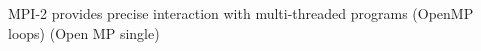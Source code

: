 
MPI-2 provides precise interaction with multi-threaded programs
  (OpenMP loops)
 (Open MP single)

